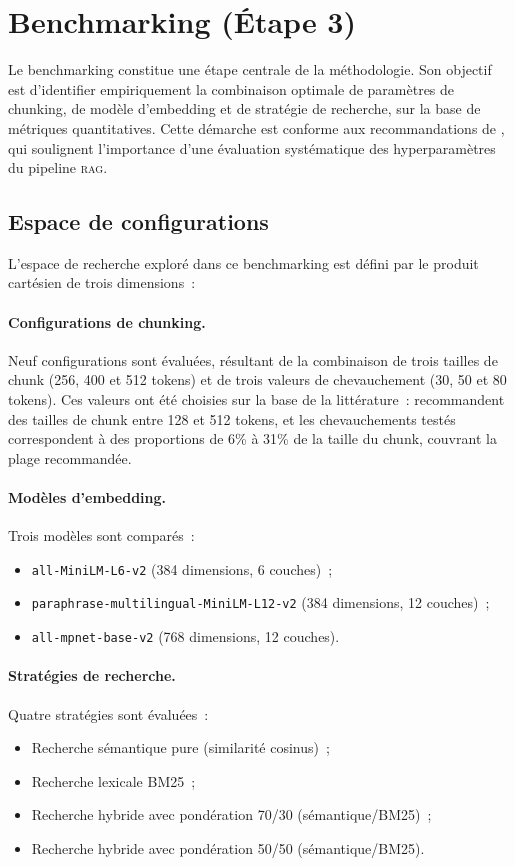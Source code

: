 \documentclass[12pt,a4paper,oneside]{report}
\newcommand{\rag}{\textsc{rag}}
\begin{document}
\section{Benchmarking (Étape 3)}
\label{sec:benchmarking}

Le benchmarking constitue une étape centrale de la méthodologie. Son objectif est d'identifier empiriquement la combinaison optimale de paramètres de chunking, de modèle d'embedding et de stratégie de recherche, sur la base de métriques quantitatives. Cette démarche est conforme aux recommandations de \citet{gao2024}, qui soulignent l'importance d'une évaluation systématique des hyperparamètres du pipeline \rag{}.

\subsection{Espace de configurations}

L'espace de recherche exploré dans ce benchmarking est défini par le produit cartésien de trois dimensions~:

\paragraph{Configurations de chunking.} Neuf configurations sont évaluées, résultant de la combinaison de trois tailles de chunk (256, 400 et 512 tokens) et de trois valeurs de chevauchement (30, 50 et 80 tokens). Ces valeurs ont été choisies sur la base de la littérature~: \citet{gao2024} recommandent des tailles de chunk entre 128 et 512 tokens, et les chevauchements testés correspondent à des proportions de 6\% à 31\% de la taille du chunk, couvrant la plage recommandée.

\paragraph{Modèles d'embedding.} Trois modèles sont comparés~:
\begin{itemize}[nosep]
  \item \texttt{all-MiniLM-L6-v2} (384 dimensions, 6 couches)~;
  \item \texttt{paraphrase-multilingual-MiniLM-L12-v2} (384 dimensions, 12 couches)~;
  \item \texttt{all-mpnet-base-v2} (768 dimensions, 12 couches).
\end{itemize}

\paragraph{Stratégies de recherche.} Quatre stratégies sont évaluées~:
\begin{itemize}[nosep]
  \item Recherche sémantique pure (similarité cosinus)~;
  \item Recherche lexicale BM25~;
  \item Recherche hybride avec pondération 70/30 (sémantique/BM25)~;
  \item Recherche hybride avec pondération 50/50 (sémantique/BM25).
\end{itemize}
\end{document}
